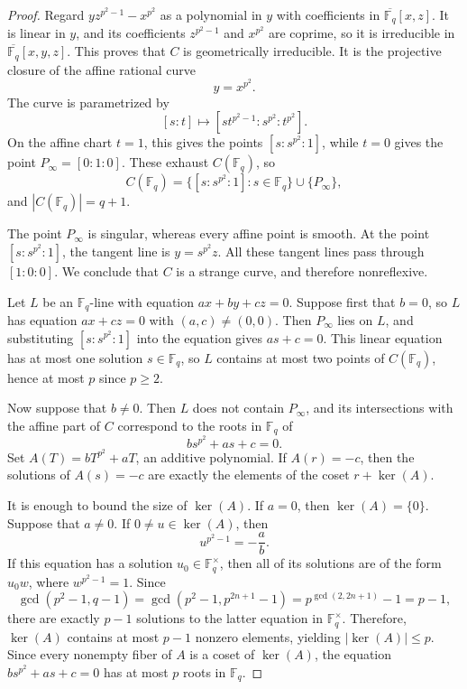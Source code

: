 \documentclass[10pt,a4paper]{amsart}
\theoremstyle{definition}
\theoremstyle{remark}
\newcommand{\Fq}{\mathbb{F}_q}
\begin{document}
\begin{proof}
Regard $yz^{p^2-1}-x^{p^2}$ as a polynomial in $y$ with coefficients in
$\overline{\Fq}[x,z]$. It is linear in $y$, and its coefficients
$z^{p^2-1}$ and $x^{p^2}$ are coprime, so it is irreducible in
$\overline{\Fq}[x,y,z]$. This proves that $C$ is geometrically irreducible. It is the projective closure of the affine rational curve
\[
y=x^{p^2}.
\]
The curve is parametrized by
\[
[s:t]\longmapsto
[st^{p^2-1}:s^{p^2}:t^{p^2}].
\]
On the affine chart $t=1$, this gives the points
$[s:s^{p^2}:1]$, while $t=0$ gives the point
$P_\infty=[0:1:0]$. These exhaust $C(\Fq)$, so
\[
C(\Fq)
=
\{[s:s^{p^2}:1]:s\in\Fq\}\cup\{P_\infty\},
\]
and $|C(\Fq)|=q+1$.

The point $P_\infty$ is singular, whereas every affine point is smooth. At the point $[s:s^{p^2}:1]$, the tangent line is $y=s^{p^2}z$. All these tangent lines pass through $[1:0:0]$. We conclude that $C$ is a strange curve, and therefore nonreflexive.

Let $L$ be an $\Fq$-line with equation $ax+by+cz=0$. Suppose first that $b=0$, so $L$ has equation $ax+cz=0$ with $(a,c)\neq(0,0)$. Then $P_\infty$ lies on $L$, and substituting $[s:s^{p^2}:1]$ into the equation gives $as+c=0$. This linear equation has at most one solution $s\in\Fq$, so $L$ contains at most two points of $C(\Fq)$, hence at most $p$ since $p\ge 2$.

Now suppose that $b\neq0$. Then $L$ does not contain $P_\infty$, and its
intersections with the affine part of $C$ correspond to the roots in
$\Fq$ of
\[
bs^{p^2}+as+c=0.
\]
Set $A(T)=bT^{p^2}+aT$, an additive polynomial. If
$A(r)=-c$, then the solutions of $A(s)=-c$ are exactly the elements of
the coset $r+\ker(A)$.

It is enough to bound the size of $\ker(A)$. If $a=0$, then
$\ker(A)=\{0\}$. Suppose that $a\neq 0$. If $0\neq u\in\ker(A)$, then
\[
u^{p^2-1}=-\frac{a}{b}.
\]
If this equation has a solution $u_0\in\Fq^\times$, then all of its solutions are of the form $u_0w$, where $w^{p^2-1}=1$. Since
\[
\gcd(p^2-1,q-1) = \gcd(p^2-1,p^{2n+1}-1) = p^{\gcd(2,2n+1)}-1 = p-1,
\]
there are exactly $p-1$ solutions to the latter equation in
$\Fq^\times$. Therefore, $\ker(A)$ contains at most $p-1$ nonzero elements, yielding $|\ker(A)|\leq p$. Since every nonempty fiber of $A$ is a coset of $\ker(A)$, the equation $bs^{p^2}+as+c=0$ has at most $p$ roots in $\Fq$.


\end{proof}
\end{document}
